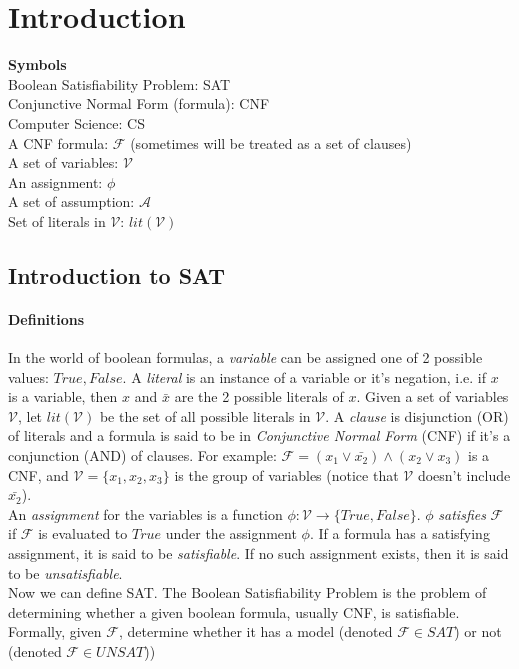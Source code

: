 \documentclass[]{article}
\begin{document}
	\pagebreak
	\tableofcontents
	\pagebreak
	
	\section{Introduction}
	\textbf{Symbols} \\
	Boolean Satisfiability Problem: SAT \\
	Conjunctive Normal Form (formula): CNF \\
	Computer Science: CS \\
	A CNF formula: $ \mathcal{F} $ (sometimes will be treated as a set of clauses) \\
	A set of variables: $ \mathcal{V} $ \\
	An assignment: $ \phi $ \\
	A set of assumption: $ \mathcal{A} $ \\
	Set of literals in $ \mathcal{V} $: $ lit(\mathcal{V}) $
	\subsection{Introduction to SAT}
	\paragraph{Definitions}
	In the world of boolean formulas, a \textit{variable} can be assigned one of 2 possible values: $ True, False $. A \textit{literal} is an instance of a variable or it's negation, i.e. if $ x $ is a variable, then $ x $ and $ \bar{x} $ are the 2 possible literals of $ x $. Given a set of variables $ \mathcal{V} $, let $ lit(\mathcal{V}) $ be the set of all possible literals in $ \mathcal{V} $. A \textit{clause} is disjunction (OR) of literals and a formula is said to be in \textit{Conjunctive Normal Form} (CNF) if it's a conjunction (AND) of clauses. For example: $\mathcal{F} = (x_1 \lor \bar{x_2}) \land (x_2 \lor x_3) $ is a CNF, and $ \mathcal{V}=\{x_1,x_2,x_3\} $ is the group of variables (notice that $ \mathcal{V} $ doesn't include $ \bar{x_2} $). \\ An \textit{assignment} for the variables is a function $ \phi : \mathcal{V} \rightarrow \{True, False\} $. $ \phi $ \textit{satisfies} $ \mathcal{F} $ if $ \mathcal{F} $ is evaluated to $ True $ under the assignment $ \phi $. If a formula has a satisfying assignment, it is said to be \textit{satisfiable}. If no such assignment exists, then it is said to be \textit{unsatisfiable}. \\
	Now we can define SAT. The Boolean Satisfiability Problem is the problem of determining whether a given boolean formula, usually CNF, is satisfiable. Formally, given $ \mathcal{F} $, determine whether it has a model (denoted $ \mathcal{F} \in SAT $) or not (denoted $ \mathcal{F} \in UNSAT $))
\end{document}
